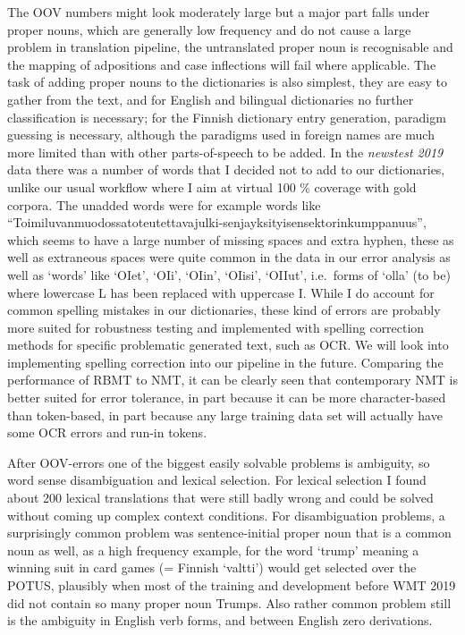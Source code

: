\documentclass[11pt,a4paper]{article}
\begin{document}
The OOV numbers might look moderately large but a major part falls under proper
nouns, which are generally low frequency and do not cause a large problem in
translation pipeline, the untranslated proper noun is recognisable and the
mapping of adpositions and case inflections will fail where applicable. The task
of adding proper nouns to the dictionaries is also simplest, they are easy to
gather from the text, and for English and bilingual dictionaries no further
classification is necessary; for the Finnish dictionary entry generation,
paradigm guessing is necessary, although the paradigms used in foreign names are
much more limited than with other parts-of-speech to be added. In the
\textit{newstest 2019} data there was a number of words that I decided not to
add to our dictionaries, unlike our usual workflow where I aim at virtual 100
\% coverage with gold corpora. The unadded words were for example words like
``Toimiluvanmuodossatoteutettavajulki-senjayksityisensektorinkumppanuus'', which
seems to have a large number of missing spaces and extra hyphen, these as well
as extraneous spaces were quite common in the data in our error analysis as well
as `words' like `OIet', `OIi', `OIin', `OIisi', `OIIut', i.e.\ forms of `olla'
(to be) where lowercase L has been replaced with uppercase I. While I do
account for common spelling mistakes in our dictionaries, these kind of errors
are probably more suited for robustness testing and implemented with spelling
correction methods for specific problematic generated text, such as OCR\@.  We
will look into implementing spelling correction into our pipeline in the
future. Comparing the performance of RBMT to NMT, it can be clearly seen that
contemporary NMT is better suited for error tolerance, in part because it can
be more character-based than token-based, in part because any large training
data set will actually have some OCR errors and run-in tokens.

After OOV-errors one of the biggest easily solvable problems is ambiguity, so
word sense disambiguation and lexical selection. For lexical selection I found
about 200 lexical translations that were still badly wrong and could be solved
without coming up complex context conditions. For disambiguation problems, a
surprisingly common problem was sentence-initial proper noun that is a common
noun as well, as a high frequency example, for the word `trump' meaning a
winning suit in card games (= Finnish `valtti') would get selected over the
POTUS, plausibly when most of the training and development before WMT 2019 did
not contain so many proper noun Trumps. Also rather common problem still is the
ambiguity in English verb forms, and between English zero derivations.
\end{document}
